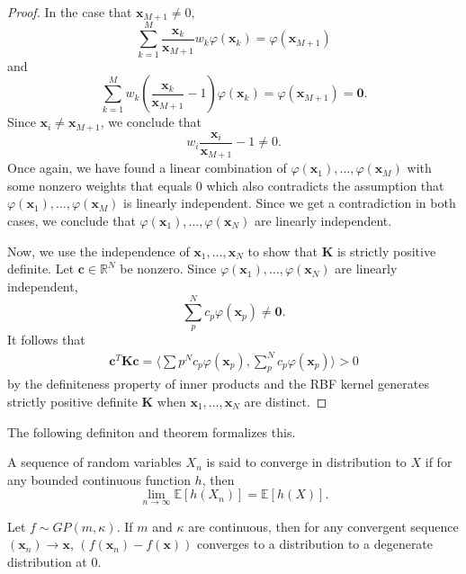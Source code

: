 \begin{proof}
    In the case that $\mathbf{x}_{M + 1} \neq 0$, 
    \begin{equation*}
        \sum\limits_{k=1}^{M} \frac{\mathbf{x}_k}{\mathbf{x}_{M + 1}} w_k \varphi(\mathbf{x}_k) = \varphi(\mathbf{x}_{M + 1})
    \end{equation*}
    and
    \begin{equation*}
        \sum\limits_{k=1}^{M} w_k \left(\frac{\mathbf{x}_k}{\mathbf{x}_{M + 1}} - 1\right) \varphi(\mathbf{x}_k) = \varphi(\mathbf{x}_{M + 1}) = \mathbf{0}.
    \end{equation*}
    Since $\mathbf{x}_i \neq \mathbf{x}_{M + 1}$, we conclude that
    \begin{equation*}
        w_i\frac{ \mathbf{x}_i }{ \mathbf{x}_{M + 1} } - 1 \neq 0.
    \end{equation*}
    Once again, we have found a linear combination of $\varphi(\mathbf{x}_1), \ldots, \varphi(\mathbf{x}_M)$ with some nonzero weights that equals 0 which also contradicts the assumption that $\varphi(\mathbf{x}_1), \ldots, \varphi(\mathbf{x}_M)$ is linearly independent.
    Since we get a contradiction in both cases, we conclude that $\varphi(\mathbf{x}_1), \ldots, \varphi(\mathbf{x}_N)$ are linearly independent.

    Now, we use the independence of $\mathbf{x}_1, \ldots, \mathbf{x}_N$ to show that $\mathbf{K}$ is strictly positive definite.
    Let $\mathbf{c} \in \mathbb{R}^{N}$ be nonzero.
    Since $\varphi(\mathbf{x}_1), \ldots, \varphi(\mathbf{x}_N)$ are linearly independent,
    \begin{equation*}
        \sum\limits_p^{N} c_p \varphi(\mathbf{x}_p) \neq \mathbf{0}.
    \end{equation*}
    It follows that
    \begin{align*}
        \mathbf{c}^{T} \mathbf{K} \mathbf{c}
        = \langle \sum\limits{p}^{N} c_p \varphi(\mathbf{x}_p), \sum\limits_{p}^{N} c_p \varphi(\mathbf{x}_p) \rangle
        > 0
    \end{align*}
    by the definiteness property of inner products
    and the RBF kernel generates strictly positive definite $\mathbf{K}$ when $\mathbf{x}_1, \ldots, \mathbf{x}_N$
    are distinct.
\end{proof}

The following definiton and theorem formalizes this.

\begin{definition}\label{def:cvg-dst}
    A sequence of random variables $X_n$ is said to converge in distribution to $X$
    if for any bounded continuous function $h$, then
    \begin{equation*}
        \lim_{n\to \infty} \mathbb{E}[h(X_n)] = \mathbb{E}[h(X)].
    \end{equation*}
\end{definition}

\begin{theorem}
    Let $f \sim GP(m, \kappa)$.
    If $m$ and $\kappa$ are continuous, then for any convergent sequence $(\mathbf{x}_n) \to \mathbf{x}$, $(f(\mathbf{x}_n) - f(\mathbf{x}))$ converges to a distribution to a degenerate distribution at 0.
\end{theorem}
